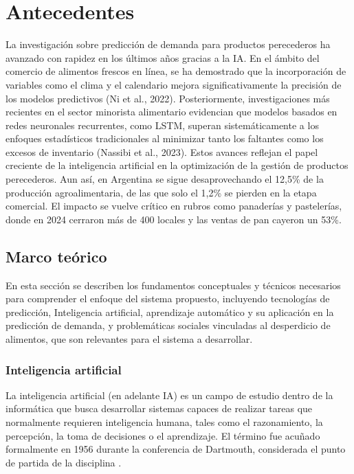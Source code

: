 \chapter{Antecedentes}\label{chapter02}

La investigación sobre predicción de demanda para productos perecederos ha avanzado con rapidez en los últimos años gracias a la IA. En el ámbito del comercio de alimentos frescos en línea, se ha demostrado que la incorporación de variables como el clima y el calendario mejora significativamente la precisión de los modelos predictivos (Ni et al., 2022). Posteriormente, investigaciones más recientes en el sector minorista alimentario evidencian que modelos basados en redes neuronales recurrentes, como LSTM, superan sistemáticamente a los enfoques estadísticos tradicionales al minimizar tanto los faltantes como los excesos de inventario (Nassibi et al., 2023). Estos avances reflejan el papel creciente de la inteligencia artificial en la optimización de la gestión de productos perecederos. Aun así, en Argentina se sigue desaprovechando el 12,5\% de la producción agroalimentaria, de las que solo el 1,2\% se pierden en la etapa comercial. El impacto se vuelve crítico en rubros como panaderías y pastelerías, donde en 2024 cerraron más de 400 locales y las ventas de pan cayeron un 53\%.


\section{Marco teórico}

En esta sección se describen los fundamentos conceptuales y técnicos necesarios para comprender el enfoque del sistema propuesto, incluyendo tecnologías de predicción, Inteligencia artificial, aprendizaje automático y su aplicación en la predicción de demanda, y problemáticas sociales vinculadas al desperdicio de alimentos, que son relevantes para el sistema a desarrollar.


\subsection{Inteligencia artificial}

La inteligencia artificial (en adelante IA) es un campo de estudio dentro de la informática que busca desarrollar sistemas capaces de realizar tareas que normalmente requieren inteligencia humana, tales como el razonamiento, la percepción, la toma de decisiones o el aprendizaje. El término fue acuñado formalmente en 1956 durante la conferencia de Dartmouth, considerada el punto de partida de la disciplina \parencite{mccarthy1955}.\\

